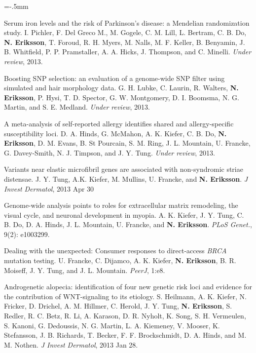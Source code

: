 \documentclass[11pt]{article}
\newenvironment{papers}[1][1]
	{\vspace{-2ex}\leftmargini=16.1mm%
	 \begin{revnumerate}[{#1}]\itemsep=-.5mm}
	{\end{revnumerate}\vspace{-2ex}}
\def\paper{\item}
\def\paperyear#1{\item[\addtocounter{enumi}{-1}%
		 {\makebox[0mm][r]{\makebox[14mm]{#1\hfill\arabic{enumi}.}}}]}
\newcounter{separated}%
\begin{document}
\begin{papers}[29]%

 
                \paperyear{\makebox[5.5ex][r]{submitted\,\,}}
        Serum iron levels and the risk of Parkinson's disease: a Mendelian randomization study.
        I. Pichler, F. Del Greco M., M. Gogele, C. M. Lill, L. Bertram, C. B. Do, \textbf{N. Eriksson}, T. Foroud, R. H. Myers, M. Nalls, M. F. Keller, B. Benyamin, J. B. Whitfield, P. P. Pramstaller, A. A. Hicks, J. Thompson, and C. Minelli.
        \textit{Under review}, 2013.

            \paper
        Boosting SNP selection: an evaluation of a genome-wide SNP filter using simulated and hair morphology data.
        G. H. Lubke, C. Laurin, R. Walters, \textbf{N. Eriksson}, P. Hysi, T. D. Spector, G. W. Montgomery, D. I. Boomsma, N. G. Martin, and S. E. Medland.
        \textit{Under review}, 2013.

            \paper
        A meta-analysis of self-reported allergy identifies shared and allergy-specific susceptibility loci.
        D. A. Hinds, G. McMahon, A. K. Kiefer, C. B. Do, \textbf{N. Eriksson}, D. M. Evans, B. St Pourcain, S. M. Ring, J. L. Mountain, U. Francke, G. Davey-Smith, N. J. Timpson, and J. Y. Tung.
        \textit{Under review}, 2013.

     
                \paperyear{2013}
        Variants near elastic microfibril genes are associated with non-syndromic striae distensae.
        J. Y. Tung, A.K. Kiefer, M. Mullins, U. Francke, and \textbf{N. Eriksson}.
        \textit{J Invest Dermatol}, 2013 Apr 30

            \paper
        Genome-wide analysis points to roles for extracellular matrix remodeling, the visual cycle, and neuronal development in myopia.
        A. K. Kiefer, J. Y. Tung, C. B. Do, D. A. Hinds, J. L. Mountain, U. Francke, and \textbf{N. Eriksson}.
        \textit{PLoS Genet.}, 9(2): e1003299.

            \paper
        Dealing with the unexpected: Consumer responses to direct-access \textit{BRCA} mutation testing.
        U. Francke, C. Dijamco, A. K. Kiefer, \textbf{N. Eriksson}, B. R. Moiseff, J. Y. Tung, and J. L. Mountain.
        \textit{PeerJ}, 1:e8.

            \paper
        Androgenetic alopecia: identification of four new genetic risk loci and evidence for the contribution of WNT-signaling to its etiology.
        S. Heilmann, A. K. Kiefer, N. Fricker, D. Drichel, A. M. Hillmer, C. Herold, J. Y. Tung, \textbf{N. Eriksson}, S. Redler, R. C. Betz, R. Li, A. Karason, D. R. Nyholt, K. Song, S. H. Vermeulen, S. Kanoni, G. Dedoussis, N. G. Martin, L. A. Kiemeney, V. Mooser, K. Stefansson, J. B. Richards, T. Becker, F. F. Brockschmidt, D. A. Hinds, and M. M. Nothen.
        \textit{J Invest Dermatol}, 2013 Jan 28.


\end{papers}
\end{document}
